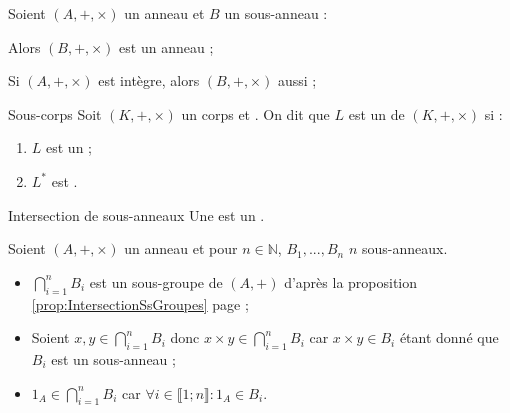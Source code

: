 \documentclass[12pt,a4paper]{report}
\begin{document}
    \begin{remarque}[Remarques]
    Soient $(A, +, \times)$ un anneau et $B$ un sous-anneau :
    \begin{itemize}[label=$\cdot$]
        \begin{multicols}{2}
        \item Alors $(B, +, \times)$ est un anneau ;
        \item Si $(A, +, \times)$ est intègre, alors $(B, +, \times)$ aussi ;
        \end{multicols}
    \end{itemize}
    \end{remarque}
    
    \begin{definition}{Sous-corps}{}
    Soit $(K, +, \times)$ un corps et . On dit que $L$ est un  de $(K, +, \times)$ si :
    \begin{multicols}{2}
    \begin{enumerate}[label=\bfseries\arabic*)]
        \item $L$ est un  ;
        \item $L^*$ est .
    \end{enumerate}
    \end{multicols}
    \end{definition}
    
    \begin{proposition}{Intersection de sous-anneaux}{}
    Une  est un .
    \end{proposition}
    
    \begin{demo}
    Soient $(A, +, \times)$ un anneau et pour $n \in \mathbb{N}$, $B_1, ..., B_n$ $n$ sous-anneaux.
    \begin{itemize}[label=$\cdot$]
        \item $\displaystyle \bigcap_{i = 1}^n B_i$ est un sous-groupe de $(A, +)$ d'après la proposition \ref{prop:IntersectionSsGroupes} page \pageref{prop:IntersectionSsGroupes} ;
        \item Soient $\displaystyle x, y \in  \bigcap_{i = 1}^n B_i$ donc $\displaystyle x \times y \in  \bigcap_{i = 1}^n B_i$ car $x \times y \in B_i$ étant donné que $B_i$ est un sous-anneau ;
        \item $\displaystyle 1_A \in \bigcap_{i = 1}^n B_i$ car $\forall i \in \llbracket 1 ; n \rrbracket : 1_A \in B_i$.
    \end{itemize}
    \end{demo}
    
\end{document}
